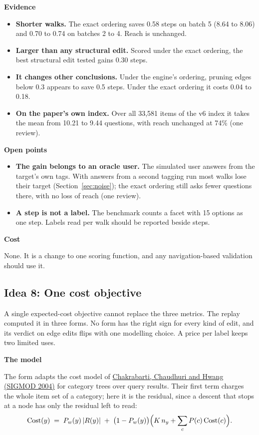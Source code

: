 \documentclass[10pt,a4paper]{article}
\newcommand{\lab}[1]{\par\vspace{0.35em}\textbf{#1}\par\nobreak}
\begin{document}
\lab{Evidence}
\begin{itemize}
\item \textbf{Shorter walks.} The exact ordering saves 0.58 steps on batch 5 (8.64 to 8.06) and 0.70 to 0.74 on batches 2 to 4. Reach is unchanged.
\item \textbf{Larger than any structural edit.} Scored under the exact ordering, the best structural edit tested gains 0.30 steps.
\item \textbf{It changes other conclusions.} Under the engine's ordering, pruning edges below 0.3 appears to save 0.5 steps. Under the exact ordering it costs 0.04 to 0.18.
\item \textbf{On the paper's own index.} Over all 33,581 items of the v6 index it takes the mean from 10.21 to 9.44 questions, with reach unchanged at 74\% (one review).
\end{itemize}

\lab{Open points}
\begin{itemize}
\item \textbf{The gain belongs to an oracle user.} The simulated user answers from the target's own tags. With answers from a second tagging run most walks lose their target (Section~\ref{sec:noise}); the exact ordering still asks fewer questions there, with no loss of reach (one review).
\item \textbf{A step is not a label.} The benchmark counts a facet with 15 options as one step. Labels read per walk should be reported beside steps.
\end{itemize}

\lab{Cost}
None. It is a change to one scoring function, and any navigation-based validation should use it.

\subsection{Idea 8: One cost objective}

A single expected-cost objective cannot replace the three metrics. The replay computed it in three forms. No
form has the right sign for every kind of edit, and its verdict on edge edits flips with one modelling
choice. A price per label keeps two limited uses.

\lab{The model}
The form adapts the cost model of
\href{https://www.microsoft.com/en-us/research/publication/automatic-categorization-of-query-results/}{Chakrabarti, Chaudhuri and Hwang (SIGMOD 2004)}
for category trees over query results. Their first term charges the whole item set of a category; here it is
the residual, since a descent that stops at a node has only the residual left to read:
\begin{equation}
\mathrm{Cost}(y) \;=\; P_w(y)\,|R(y)| \;+\; \bigl(1 - P_w(y)\bigr)\Bigl(K\,n_y + \sum_{c} P(c)\,\mathrm{Cost}(c)\Bigr).
\end{equation}
\end{document}
